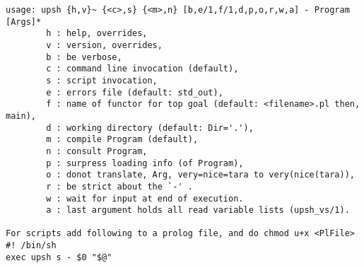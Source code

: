 \begin{verbatim}
usage: upsh {h,v}~ {<c>,s} {<m>,n} [b,e/1,f/1,d,p,o,r,w,a] - Program [Args]*
        h : help, overrides,
        v : version, overrides,
        b : be verbose,
        c : command line invocation (default),
        s : script invocation,
        e : errors file (default: std_out),
        f : name of functor for top goal (default: <filename>.pl then, main),
        d : working directory (default: Dir='.'),
        m : compile Program (default),
        n : consult Program,
        p : surpress loading info (of Program),
        o : donot translate, Arg, very=nice=tara to very(nice(tara)),
        r : be strict about the `-' .
        w : wait for input at end of execution.
        a : last argument holds all read variable lists (upsh_vs/1).

For scripts add following to a prolog file, and do chmod u+x <PlFile>
#! /bin/sh
exec upsh s - $0 "$@"
\end{verbatim}
